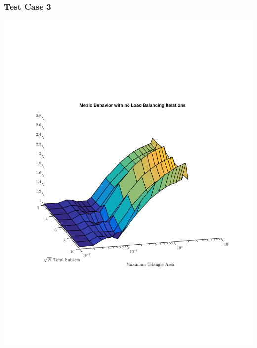 \documentclass[]{beamer}
\begin{document}
\begin{frame}[t]\frametitle{Test Case 3}
\includegraphics[scale=0.47, trim = 0cm 8cm 0cm 7cm]{figures/lattice_no_iter.pdf}
\end{frame}
\end{document}
